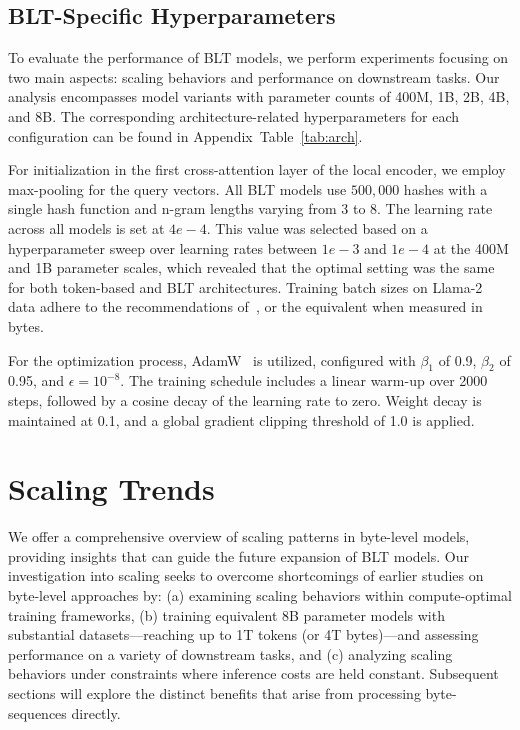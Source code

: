 \subsection{{\textsc BLT}-Specific Hyperparameters}

To evaluate the performance of {\textsc BLT} models, we perform experiments focusing on two main aspects: scaling behaviors and performance on downstream tasks. Our analysis encompasses model variants with parameter counts of 400M, 1B, 2B, 4B, and 8B. The corresponding architecture-related hyperparameters for each configuration can be found in Appendix~Table~\ref{tab:arch}.

For initialization in the first cross-attention layer of the local encoder, we employ max-pooling for the query vectors. All {\textsc BLT} models use $500,000$ hashes with a single hash function and n-gram lengths varying from 3 to 8. The learning rate across all models is set at $4e-4$. This value was selected based on a hyperparameter sweep over learning rates between $1e-3$ and $1e-4$ at the 400M and 1B parameter scales, which revealed that the optimal setting was the same for both token-based and {\textsc BLT} architectures. Training batch sizes on Llama-2 data adhere to the recommendations of~\cite{dubey2024llama}, or the equivalent when measured in bytes. 

For the optimization process, AdamW~\citep{adamw} is utilized, configured with $\beta_1$ of 0.9, $\beta_2$ of 0.95, and $\epsilon=10^{-8}$. The training schedule includes a linear warm-up over 2000 steps, followed by a cosine decay of the learning rate to zero. Weight decay is maintained at 0.1, and a global gradient clipping threshold of 1.0 is applied.

\section{Scaling Trends}
\label{section:scaling}

We offer a comprehensive overview of scaling patterns in byte-level models, providing insights that can guide the future expansion of {\textsc BLT} models. Our investigation into scaling seeks to overcome shortcomings of earlier studies on byte-level approaches by: (a) examining scaling behaviors within compute-optimal training frameworks, (b) training equivalent 8B parameter models with substantial datasets—reaching up to 1T tokens (or 4T bytes)—and assessing performance on a variety of downstream tasks, and (c) analyzing scaling behaviors under constraints where inference costs are held constant. Subsequent sections will explore the distinct benefits that arise from processing byte-sequences directly.

